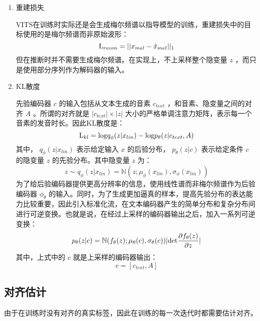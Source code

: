 \documentclass[cn,10pt,math=newtx,citestyle=gb7714-2015,bibstyle=gb7714-2015]{elegantbook}
\begin{document}
\begin{enumerate}
  \item 重建损失
  
  VITS在训练时实际还是会生成梅尔频谱以指导模型的训练，重建损失中的目标使用的是梅尔频谱而非原始波形：
  \begin{equation}
    {\rm L}_{recon}=||x_{mel}-\hat{x}_{mel}||_1
  \end{equation}
  但在推断时并不需要生成梅尔频谱。在实现上，不上采样整个隐变量 $z$ ，而只是使用部分序列作为解码器的输入。

  \item KL散度
  
  先验编码器 $c$ 的输入包括从文本生成的音素 $c_{text}$ ，和音素、隐变量之间的对齐 $A$ 。所谓的对齐就是 $|c_{text}|\times |z|$ 大小的严格单调注意力矩阵，表示每一个音素的发音时长。因此KL散度是：
  \begin{equation}
    {\rm L}_{kl}={\rm log}q_{\phi}(z|x_{lin})-{\rm log}p_\theta (z|c_{text},A)
  \end{equation}
  其中， $q_{\phi}(z|x_{lin})$ 表示给定输入 $x$ 的后验分布， $p_\theta(z|c)$ 表示给定条件 $c$ 的隐变量 $z$ 的先验分布。其中隐变量 $z$ 为：
  \begin{equation}
    z\sim q_\phi(z|x_{lin})=\mathbb{N}(z;\mu_\phi(x_{lin}),\sigma_\phi(x_{lin}))
  \end{equation}
  为了给后验编码器提供更高分辨率的信息，使用线性谱而非梅尔频谱作为后验编码器 $\phi_\theta$ 的输入。同时，为了生成更加逼真的样本，提高先验分布的表达能力比较重要，因此引入标准化流，在文本编码器产生的简单分布和复杂分布间进行可逆变换。也就是说，在经过上采样的编码器输出之后，加入一系列可逆变换：
  \begin{equation}
    p_\theta(z|c)=\mathbb{N}(f_\theta(z);\mu_\theta(c),\sigma_\theta(c))|{\rm det}\frac{\partial f_\theta(z)}{\partial z}|
  \end{equation}
  其中，上式中的 $c$ 就是上采样的编码器输出：
  \begin{equation}
    c=[c_{text},A]
  \end{equation}
\end{enumerate}


\subsection{对齐估计}

由于在训练时没有对齐的真实标签，因此在训练的每一次迭代时都需要估计对齐。
\end{document}
